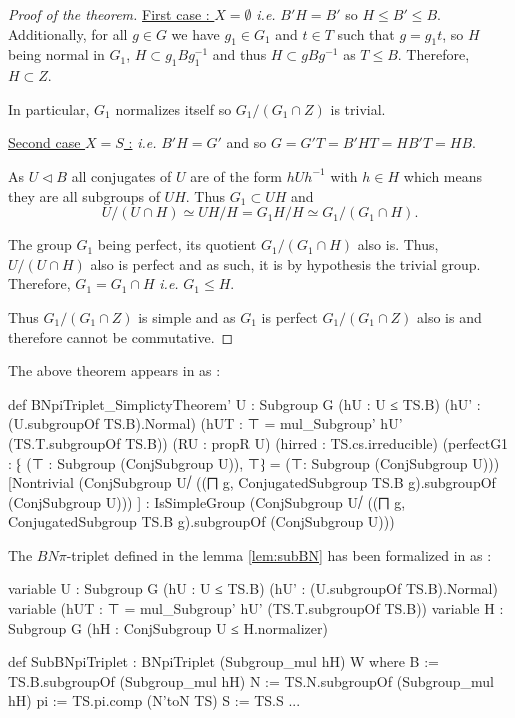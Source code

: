 \begin{proof}[Proof of the theorem]
     \underline{First case : $X = \emptyset$} \textit{i.e.} $B' H = B'$ so $H \le B' \le B$. Additionally, for all $g \in G$ we have $g_1 \in G_1$ and $t \in T$ such that $g = g_1 t$, so $H$ being normal in $G_1$, $H \subset g_1 B g_1^{-1}$ and thus $H \subset g B g^{-1}$ as $T \le B$. Therefore, $ H \subset Z$.

     In particular, $G_1$ normalizes itself so $G_1 / \left( G_1 \cap Z \right)$ is trivial.

    \underline {Second case $X = S$ :} \textit{i.e.} $B'H = G'$ and so $G = G'T= B'HT = HB'T = HB.$

       As $U \triangleleft B$ all conjugates of $U$ are of the form $h U h^{-1}$ with $h \in  H$ which means they are all subgroups of $UH$. Thus $G_1 \subset UH$ and 
       $$U / \left( U \cap  H \right) \simeq UH / H = G_1H / H \simeq G_1 / \left( G_1 \cap H \right).$$

The group $G_1$ being perfect, its quotient $G_1 / \left( G_1 \cap H \right)$ also is. Thus, $U / (U \cap H)$ also is perfect and as such, it is by hypothesis the trivial group. Therefore, $G_1 = G_1 \cap H$ \textit{i.e.} $ G_1 \le H$.

Thus $G_1 / \left( G_1 \cap Z \right)$ is simple and as $G_1$ is perfect $G_1 / \left( G_1 \cap Z \right)$ also is and therefore cannot be commutative.
\end{proof}

The above theorem appears in \Lean as :
\begin{leancode}
def BNpiTriplet_SimplictyTheorem'  {U : Subgroup G} (hU : U ≤ TS.B) (hU' : (U.subgroupOf TS.B).Normal) 
 (hUT : ⊤ = mul_Subgroup' hU' (TS.T.subgroupOf TS.B)) (RU : propR U) (hirred : TS.cs.irreducible)
  (perfectG1 : ⁅ (⊤ : Subgroup (ConjSubgroup U)), ⊤⁆ = (⊤: Subgroup (ConjSubgroup U)))
   [Nontrivial (ConjSubgroup U⧸ ((⨅ g, ConjugatedSubgroup TS.B g).subgroupOf (ConjSubgroup U))) ] :
    IsSimpleGroup (ConjSubgroup U⧸ ((⨅ g, ConjugatedSubgroup TS.B g).subgroupOf (ConjSubgroup U)))
\end{leancode}

\begin{remark}
    The $BN\pi$-triplet defined in the lemma \ref{lem:subBN} has been formalized in \Lean as :

\begin{leancode}
variable {U : Subgroup G} (hU : U ≤ TS.B) (hU' : (U.subgroupOf TS.B).Normal)
variable (hUT : ⊤ = mul_Subgroup' hU' (TS.T.subgroupOf TS.B))
variable {H : Subgroup G} (hH : ConjSubgroup U ≤ H.normalizer)

def SubBNpiTriplet : BNpiTriplet (Subgroup_mul  hH) W where
  B := TS.B.subgroupOf (Subgroup_mul hH)
  N := TS.N.subgroupOf (Subgroup_mul hH)
  pi := TS.pi.comp (N'toN TS)
  S := TS.S
  ... 
\end{leancode}
\end{remark}

